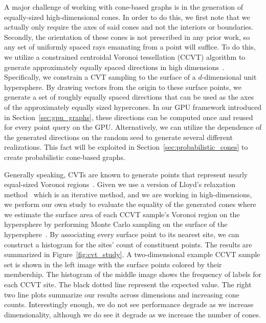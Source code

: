 A major challenge of working with cone-based graphs is in the generation of equally-sized high-dimensional cones.
%
In order to do this, we first note that we actually only require the axes of said cones and not the interiors or boundaries.
%
Secondly, the orientation of these cones is not prescribed in any prior work, so any set of uniformly spaced rays emanating from a point will suffice.
%
To do this, we utilize a constrained centroidal Voronoi tessellation (CCVT) algorithm to generate approximately equally spaced directions in high dimensions~\cite{DuGunzburgerJu2003}.
%
Specifically, we constrain a CVT sampling to the surface of a $d$-dimensional unit hypersphere.
%
By drawing vectors from the origin to these surface points, we generate a set of roughly equally spaced directions that can be used as the axes of the approximately equally sized hypercones.
%
In our GPU framework introduced in Section~\ref{sec:gpu_graphs}, these directions can be computed once and reused for every point query on the GPU.
%
Alternatively, we can utilize the dependence of the generated directions on the random seed to generate several different realizations.
%
This fact will be exploited in Section~\ref{sec:probabilistic_cones} to create probabilistic cone-based graphs.

Generally speaking, CVTs are known to generate points that represent nearly equal-sized Voronoi
regions~\cite{HesseSloanWomersley2015,PeyreCohen2004}.
%
Given we use a version of Lloyd's relaxation method~\cite{DuGunzburgerJu2003} which is an iterative method, and we are working in high-dimensions, we perform our own study to evaluate the equality of the generated cones where we estimate the surface area of each CCVT sample's Voronoi region on the hypersphere by performing Monte Carlo sampling on the surface of the hypersphere~\cite{HarmanLacko2010,HicksWheeling1959}.
%
By associating every surface point to its nearest site, we can construct a histogram for the sites' count of constituent points.
%
The results are summarized in Figure~\ref{fig:cvt_study}.
%
A two-dimensional example CCVT sample set is shown in the left image with the surface points colored by their membership.
%
The histogram of the middle image shows the frequency of labels for each CCVT site.
%
The black dotted line represent the expected value.
%
The right two line plots summarize our results across dimensions and increasing cone counts.
%
Interestingly enough, we do not see performance degrade as we increase dimensionality, although we do see it degrade as we increase the number of cones.

